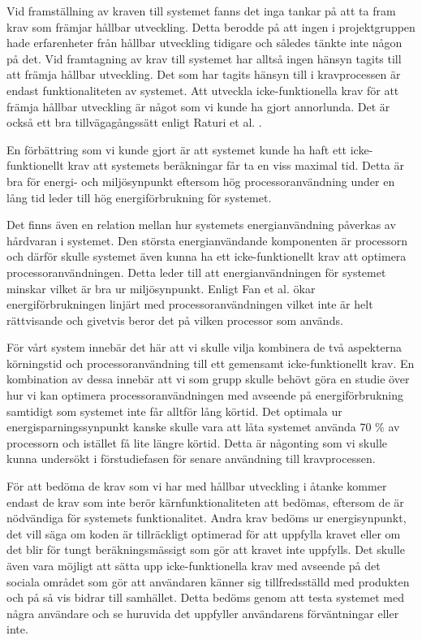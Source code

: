 Vid framställning av kraven till systemet fanns det inga tankar på att ta fram krav som främjar hållbar utveckling. Detta berodde på att ingen i projektgruppen hade erfarenheter från hållbar utveckling tidigare och således tänkte inte någon på det. Vid framtagning av krav till systemet har alltså ingen hänsyn tagits till att främja hållbar utveckling. Det som har tagits hänsyn till i kravprocessen är endast funktionaliteten av systemet. Att utveckla icke-funktionella krav för att främja hållbar utveckling är något som vi kunde ha gjort annorlunda. Det är också ett bra tillvägagångssätt enligt Raturi et al. \cite{raturi2014developing}.

En förbättring som vi kunde gjort är att systemet kunde ha haft ett icke-funktionellt krav att systemets beräkningar får ta en viss maximal tid. Detta är bra för energi- och miljösynpunkt eftersom hög processoranvändning under en lång tid leder till hög energiförbrukning för systemet.

Det finns även en relation mellan hur systemets energianvändning påverkas av hårdvaran i systemet. Den största energianvändande komponenten är processorn och därför skulle systemet även kunna ha ett icke-funktionellt krav att optimera processoranvändningen. Detta leder till att energianvändningen för systemet minskar vilket är bra ur miljösynpunkt. Enligt Fan et al. \cite{fan2007power} ökar energiförbrukningen linjärt med processoranvändningen vilket inte är helt rättvisande och givetvis beror det på vilken processor som används.

För vårt system innebär det här att vi skulle vilja kombinera de två aspekterna körningstid och processoranvändning till ett gemensamt icke-funktionellt krav. En kombination av dessa innebär att vi som grupp skulle behövt göra en studie över hur vi kan optimera processoranvändningen med avseende på energiförbrukning samtidigt som systemet inte får alltför lång körtid. Det optimala ur energisparningssynpunkt kanske skulle vara att låta systemet använda 70 \% av processorn och istället få lite längre körtid. Detta är någonting som vi skulle kunna undersökt i förstudiefasen för senare användning till kravprocessen.

För att bedöma de krav som vi har med hållbar utveckling i åtanke kommer endast de krav som inte berör kärnfunktionaliteten att bedömas, eftersom de är nödvändiga för systemets funktionalitet. Andra krav bedöms ur energisynpunkt, det vill säga om koden är tillräckligt optimerad för att uppfylla kravet eller om det blir för tungt beräkningsmässigt som gör att kravet inte uppfylls. Det skulle även vara möjligt att sätta upp icke-funktionella krav med avseende på det sociala området som gör att användaren känner sig tillfredsställd med produkten och på så vis bidrar till samhället. Detta bedöms genom att testa systemet med några användare och se huruvida det uppfyller användarens förväntningar eller inte.

